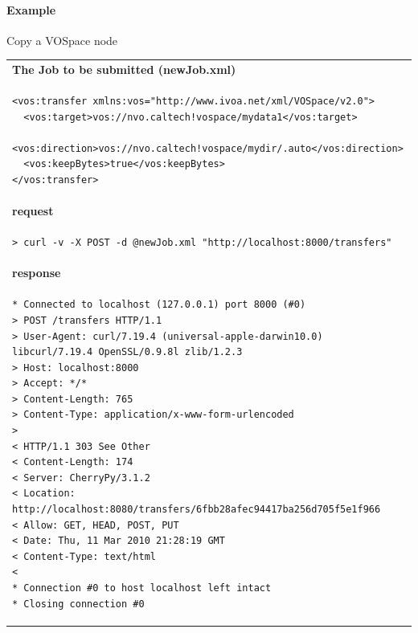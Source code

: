 \documentclass[11pt,a4paper]{ivoa}
\begin{document}
\paragraph{Example}
Copy a VOSpace node

\begin{tabular}{ p{10cm} }
\\
\textbf{The Job to be submitted (newJob.xml)} \\
\begin{lstlisting}
<vos:transfer xmlns:vos="http://www.ivoa.net/xml/VOSpace/v2.0">
  <vos:target>vos://nvo.caltech!vospace/mydata1</vos:target>
  <vos:direction>vos://nvo.caltech!vospace/mydir/.auto</vos:direction>
  <vos:keepBytes>true</vos:keepBytes>
</vos:transfer>
\end{lstlisting} \\
\textbf{request} \\
\begin{lstlisting}
> curl -v -X POST -d @newJob.xml "http://localhost:8000/transfers"
\end{lstlisting} \\
\textbf{response} \\
\begin{lstlisting}
* Connected to localhost (127.0.0.1) port 8000 (#0)
> POST /transfers HTTP/1.1
> User-Agent: curl/7.19.4 (universal-apple-darwin10.0) libcurl/7.19.4 OpenSSL/0.9.8l zlib/1.2.3
> Host: localhost:8000
> Accept: */*
> Content-Length: 765
> Content-Type: application/x-www-form-urlencoded
> 
< HTTP/1.1 303 See Other
< Content-Length: 174
< Server: CherryPy/3.1.2
< Location: http://localhost:8080/transfers/6fbb28afec94417ba256d705f5e1f966
< Allow: GET, HEAD, POST, PUT
< Date: Thu, 11 Mar 2010 21:28:19 GMT
< Content-Type: text/html
< 
* Connection #0 to host localhost left intact
* Closing connection #0
\end{lstlisting} \\
\end{tabular}
\end{document}
